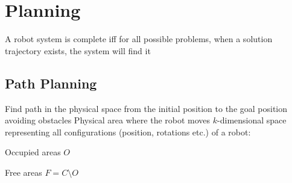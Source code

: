 
\section{Planning}
\begin{itemize}
     A robot system is complete iff for all possible problems, when a solution trajectory exists, the system will find it
\end{itemize}
\subsection{Path Planning}
\begin{itemize}
     Find path in the physical space from the initial position to the goal position avoiding obstacles
     Physical area where the robot moves
     $k$-dimensional space representing all configurations (position, rotations etc.) of a robot:
        \begin{itemize*}
            \item Occupied areas $O$
            \item Free areas $F = C \setminus O$
        \end{itemize*}
\end{itemize}

